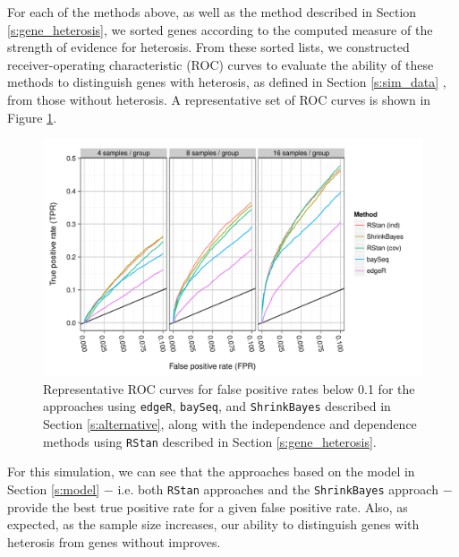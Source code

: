 \documentclass[useAMS,usenatbib,referee]{biom}
\newcommand{\RStan}{{\tt RStan}}
\newcommand{\edgeR}{{\tt edgeR}}
\newcommand{\ShrinkBayes}{{\tt ShrinkBayes}}
\begin{document}
For each of the methods above, as well as the method described in Section \ref{s:gene_heterosis}, we sorted genes according to the computed measure of the strength of evidence for heterosis. From these sorted lists, we constructed receiver-operating characteristic (ROC) curves to evaluate the ability of these methods to distinguish genes with heterosis, as defined in Section \ref{s:sim_data}  \citep{landau2013dispersion}, 
from those without heterosis. A representative set of ROC curves is shown in Figure \ref{f:roc}. 
\begin{figure}[htbp]
\centerline{\includegraphics[width=\textwidth]{exampleROC0_1}}
\caption{Representative ROC curves for false positive rates below 0.1 for the approaches using \edgeR{}, {\tt baySeq},  and \ShrinkBayes{} described in Section \ref{s:alternative}, along with the independence and dependence methods using \RStan{} described in Section \ref{s:gene_heterosis}.}
\label{f:roc}
\end{figure}
For this simulation, we can see that the approaches based on the model in Section \ref{s:model} $-$ i.e. both \RStan{} approaches and the \ShrinkBayes{} approach $-$ provide the best true positive rate for a given false positive rate. Also, as expected, as the sample size increases, our ability to distinguish genes with heterosis from genes without improves.
\end{document}
